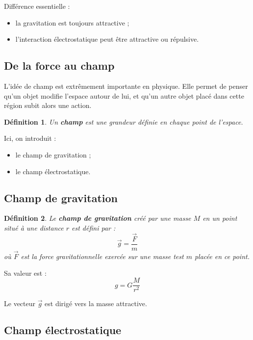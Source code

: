 \documentclass[11pt,a4paper]{article}
\newtheorem{definition}{Définition}[section]
\begin{document}
\begin{attentionbox}
Différence essentielle :
\begin{itemize}
    \item la gravitation est toujours attractive ;
    \item l'interaction électrostatique peut être attractive ou répulsive.
\end{itemize}
\end{attentionbox}

\subsection{De la force au champ}

L'idée de champ est extrêmement importante en physique.  
Elle permet de penser qu'un objet modifie l'espace autour de lui, et qu'un autre objet placé dans cette région subit alors une action.

\begin{definition}
Un \textbf{champ} est une grandeur définie en chaque point de l'espace.
\end{definition}

Ici, on introduit :
\begin{itemize}
    \item le champ de gravitation ;
    \item le champ électrostatique.
\end{itemize}

\subsection{Champ de gravitation}

\begin{definition}
Le \textbf{champ de gravitation} créé par une masse $M$ en un point situé à une distance $r$ est défini par :
\[
\vec{g} = \frac{\vec{F}}{m}
\]
où $\vec{F}$ est la force gravitationnelle exercée sur une masse test $m$ placée en ce point.
\end{definition}

Sa valeur est :
\[
g = G\frac{M}{r^2}
\]

Le vecteur $\vec{g}$ est dirigé vers la masse attractive.

\subsection{Champ électrostatique}
\end{document}

